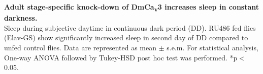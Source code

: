\label{fig:S}
\textbf{Adult stage-specific knock-down of DmCa\textsubscript{v}3 increases sleep in constant darkness.}
\\
Sleep during subjective daytime in continuous dark period (DD). 
RU486 fed flies (Elav-GS\textgreaterRNAi) show significantly increased sleep in second day of DD compared to unfed control flies.
Data are represented as mean $\pm$ s.e.m.
For statistical analysis, One-way ANOVA followed by Tukey-HSD post hoc test was performed.
*p$<$0.05.
  


  
  
  
  